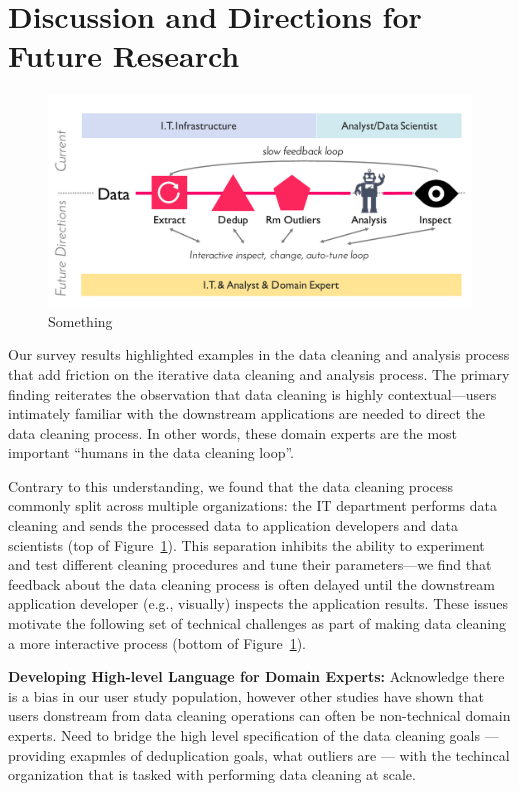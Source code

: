 \section{Discussion and Directions for Future Research}\label{sec:future}


\begin{figure}
  \centering
  \includegraphics[width=.8\columnwidth]{datafigs/arch}
  \caption{Something}
  \label{f:arch}
\end{figure}

Our survey results highlighted examples in the data cleaning and analysis process that add friction on the iterative data cleaning and analysis process.  The primary finding reiterates the observation that data cleaning is highly contextual---users intimately familiar with the downstream applications are needed to direct the data cleaning process.  In other words, these domain experts are the most important ``humans in the data cleaning loop''.  

Contrary to this understanding, we found that the data cleaning process commonly split across multiple organizations: the IT department performs data cleaning and sends the processed data to application developers and data scientists (top of Figure~\ref{f:arch}).  This separation inhibits the ability to experiment and test different cleaning procedures and tune their parameters---we find that feedback about the data cleaning process is often delayed until the downstream application developer (e.g., visually) inspects the application results.  These issues motivate the following set of technical challenges as part of making data cleaning a more interactive process (bottom of Figure~\ref{f:arch}). 



\noindent\textbf{Developing High-level Language for Domain Experts:}  Acknowledge there is a bias in our user study population, however other studies have shown that users donstream from data cleaning operations can often be non-technical domain experts.  Need to bridge the high level specification of the data cleaning goals --- providing exapmles of deduplication goals, what outliers are --- with the techincal organization that is tasked with performing data cleaning at scale.

